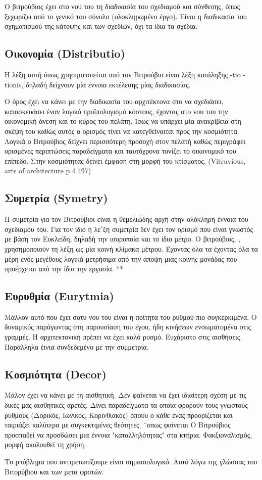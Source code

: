   Ο βιτρούβιος έχει στο νου του τη διαδικασία του σχεδιαμού και σύνθεσης, όπως ξεχωρίζει από το γενικό του σύνολο (ολοκληρωμένο έργο). Είναι η διαδικασία του σχηματισμού της κάτοψης και των σχεδίων, όχι τα ίδια τα σχέδια.
  
\subsection{Οικονομία (Distributio)}

  Η λέξη αυτή όπως χρησιμοποιείται από τον Βιτρούβιο είναι λέξη κατάληξης -tio -tionis, δηλαδή δείχνουν μία έννοια εκτέλεσης μίας διαδικασίας.
  
  Ο όρος έχει να κάνει με την διαδικασία του αρχιτέκτονα στο να σχεδιάσει, κατασκευάσει έναν λογικό προϊπολογισμό κόστους, έχοντας στο νου του την οικονομική άνεση και το κύρος του πελάτη. Ίσως να υπάρχει μία ανακρίβεια στη σκέψη του καθώς αυτός ο ορισμός τίνει να κατεγθείναιται προς την κοσμιότητα. Λογικά ο Βιτρούβιος δείχνει περισσότερη προσοχή στον πελάτή καθώς περιγράφει ορισμένες περιπτώσεις παραδείγματα και ταυτόχρονα τονίζει το οικονομικό του επίπεδο. Στην κοσμιότητας δείνει έμφαση στη μορφή του κτίσματος. (Vitruvious, arts of architecture p.4 497)
  
\subsection{Συμετρία (Symetry)}

  Η συμετρία για τον Βιτρούβιοι είναι η θεμελιώδης αρχή στην ολόκληρη έννοια του σχεδιαμόυ του. Για τον ίδιο η λε΄ξη συμετρία δεν έχει τον ορισμό που είναι γνωστός με βάση τον Ευκλείδη, δηλαδή την ισοροποία και το ίδιο μέτρο. Ο βιτρούβιος, , χρησημοποιούν τη λέξη ως μία κοινή κλίμακα μέτρου. Έχοντας όλα τα έχοντας όλα τα μέρη ενός μεγέθους λογικά μετρήσιμα από την άποψη μιας κοινής μονάδας που προέρχεται από την ίδια την εργασία. ** 
  
  \subsection{Ευρυθμία (Eurytmia)}
  
  Μάλλον αυτό που έχει σοτυ νου του είναι η ποίτητα του ρυθμού πιο συγκερκιμένα. Ο δυναμικός παράγωντας στη παρουσίαση του έγου, ήδη κινήσεων ενσωματομένα στις γραμμές. Η αρχιτεκτονική πρέπει να έχει καλό ρυσμό. Ευχάριστο στις αισθήσεις. Παράλληλα έινια συνδεδεμένο με την  συμμετρία.
  
  \subsection{Κοσμιότητα (Decor)}
  
  Μάλον έχει να κάνει με τη  αισθητική. Δεν φαίνεται να έχει ιδιαίτερη σχέση με τις δικές μας αισθητικές αρετές.
  Δίνει παραδείγματα τα οποία φρορούν τους γνωστούς ρυθμούς (Δορικός, Ιωνικός, Κορινθιακός) όπουυ ο κάθε ένας προορίζεται και ταιριάζει καλύτερα με συγκεκτιμένες θεότητες.
  ¨οπως φαίνεται Ο Βιτρούβιος προσπαθεί να προσδώσει μια έννοια "καταλληλότητας" στα κτήρια. Φακξιοναλισμός, μορφή ακολουθεί τη χρήση.
  
  Το ρπόβλημα που αντιμετωπίζουμε είναι σημασιολογικό. Αυτό λόγω της γλώσσας του Βιτορύβιου και των μετα φρστών. 